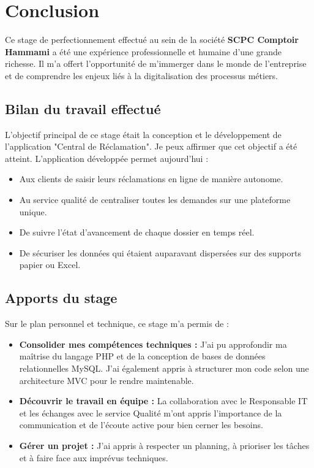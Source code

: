 \chapter*{Conclusion}

Ce stage de perfectionnement effectué au sein de la société \textbf{SCPC Comptoir Hammami} a été une expérience professionnelle et humaine d'une grande richesse. Il m'a offert l'opportunité de m'immerger dans le monde de l'entreprise et de comprendre les enjeux liés à la digitalisation des processus métiers.

\section*{Bilan du travail effectué}
L'objectif principal de ce stage était la conception et le développement de l'application "Central de Réclamation". Je peux affirmer que cet objectif a été atteint. L'application développée permet aujourd'hui :
\begin{itemize}
    \item Aux clients de saisir leurs réclamations en ligne de manière autonome.
    \item Au service qualité de centraliser toutes les demandes sur une plateforme unique.
    \item De suivre l'état d'avancement de chaque dossier en temps réel.
    \item De sécuriser les données qui étaient auparavant dispersées sur des supports papier ou Excel.
\end{itemize}

\section*{Apports du stage}
Sur le plan personnel et technique, ce stage m'a permis de :
\begin{itemize}
    \item \textbf{Consolider mes compétences techniques :} J'ai pu approfondir ma maîtrise du langage PHP et de la conception de bases de données relationnelles MySQL. J'ai également appris à structurer mon code selon une architecture MVC pour le rendre maintenable.
    \item \textbf{Découvrir le travail en équipe :} La collaboration avec le Responsable IT et les échanges avec le service Qualité m'ont appris l'importance de la communication et de l'écoute active pour bien cerner les besoins.
    \item \textbf{Gérer un projet :} J'ai appris à respecter un planning, à prioriser les tâches et à faire face aux imprévus techniques.
\end{itemize}

